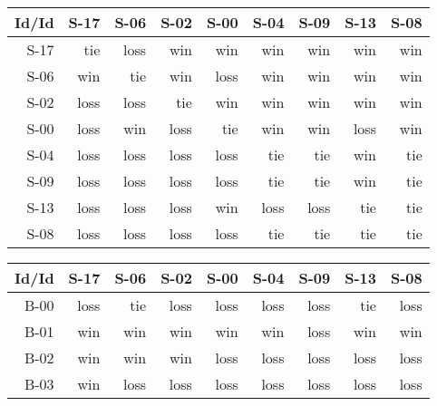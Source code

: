 \begin{tabular}{ | r | r | r | r | r | r | r | r | r | }
    \hline
        Id/Id  &   S-17  &   S-06  &   S-02  &   S-00  &   S-04  &   S-09  &   S-13  &   S-08  \\
    \hline
    \hline
         S-17  &    tie  &   loss  &    win  &    win  &    win  &    win  &    win  &    win  \\
    \hline
         S-06  &    win  &    tie  &    win  &   loss  &    win  &    win  &    win  &    win  \\
    \hline
         S-02  &   loss  &   loss  &    tie  &    win  &    win  &    win  &    win  &    win  \\
    \hline
         S-00  &   loss  &    win  &   loss  &    tie  &    win  &    win  &   loss  &    win  \\
    \hline
         S-04  &   loss  &   loss  &   loss  &   loss  &    tie  &    tie  &    win  &    tie  \\
    \hline
         S-09  &   loss  &   loss  &   loss  &   loss  &    tie  &    tie  &    win  &    tie  \\
    \hline
         S-13  &   loss  &   loss  &   loss  &    win  &   loss  &   loss  &    tie  &    tie  \\
    \hline
         S-08  &   loss  &   loss  &   loss  &   loss  &    tie  &    tie  &    tie  &    tie  \\
    \hline
\end{tabular}


\begin{tabular}{ | r | r | r | r | r | r | r | r | r | }
    \hline
        Id/Id  &   S-17  &   S-06  &   S-02  &   S-00  &   S-04  &   S-09  &   S-13  &   S-08  \\
    \hline
    \hline
         B-00  &   loss  &    tie  &   loss  &   loss  &   loss  &   loss  &    tie  &   loss  \\
    \hline
         B-01  &    win  &    win  &    win  &    win  &    win  &   loss  &    win  &    win  \\
    \hline
         B-02  &    win  &    win  &    win  &   loss  &   loss  &   loss  &   loss  &   loss  \\
    \hline
         B-03  &    win  &   loss  &   loss  &   loss  &   loss  &   loss  &   loss  &   loss  \\
    \hline
\end{tabular}




